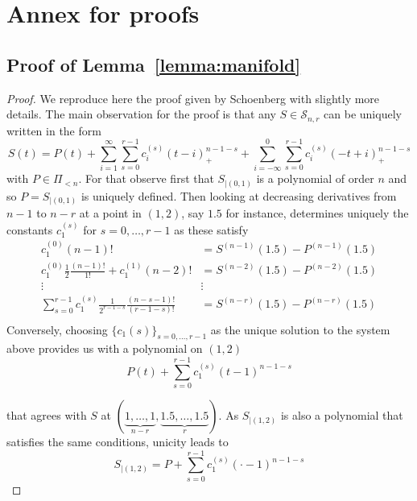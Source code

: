 \chapter{Annex for proofs}\label{chapter:annexA}

\section{Proof of Lemma~\ref{lemma:manifold}}
\begin{proof} We reproduce here the proof given by Schoenberg with slightly more details. The main observation for the 
  proof is that any $S \in \mathscr{S}_{n,r}$ can be uniquely written in the form
  \begin{equation*}
    S(t) = P(t) + \sum_{i=1}^{\infty} \sum_{s=0}^{r-1} c_i^{(s)} {(t-i)}_+^{n-1-s} + \sum_{i=-\infty}^0 \sum_{s=0}^{r-1} 
    c_i^{(s)} {(-t+i)}_+^{n-1-s}
  \end{equation*}
  with $P \in \Pi_{<n}$. For that observe first that $S_{|(0,1)}$ is a polynomial of order $n$ and so $P = S_{|(0,1)}$ 
  is uniquely defined.  Then looking at decreasing derivatives from $n-1$ to $n-r$ at a point in $(1,2)$, say $1.5$ for 
  instance, determines uniquely the constants $c_1^{(s)}$ for $s=0, \ldots, r-1$ as these satisfy \begin{align*}
    c_1^{(0)} (n-1)! &= S^{(n-1)}(1.5) - P^{(n-1)}(1.5) \\
    c_1^{(0)} \frac{1}{2} \frac{(n-1)!}{1!} + c_1^{(1)} (n-2)! &= S^{(n-2)}(1.5) - P^{(n-2)}(1.5) \\
    \vdots & \vdots \\
    \sum_{s=0}^{r-1} c_1^{(s)} \frac{1}{2^{r-1-s}} \frac{(n-s-1)!}{(r-1-s)!} &= S^{(n-r)}(1.5) - P^{(n-r)}(1.5) \\
  \end{align*}
  Conversely, choosing ${\{c_1{(s)}\}}_{s=0, \ldots, r-1}$ as the unique solution to the system above provides us with a 
  polynomial on $(1,2)$
  \begin{equation*}
    P(t) + \sum_{s=0}^{r-1} c_1^{(s)} {(t-1)}^{n-1-s}
  \end{equation*} 
  
  that agrees with $S$ at $(\underbrace{1, \ldots, 1}_{n-r}, \underbrace{1.5, \ldots, 1.5}_r)$. As $S_{|(1,2)}$ is also 
  a polynomial that satisfies the same conditions, unicity leads to 
  \begin{equation*}
    S_{|(1,2)}=P + \sum_{s=0}^{r-1} c_1^{(s)} {(\cdot-1)}^{n-1-s}
  \end{equation*}


\end{proof}
